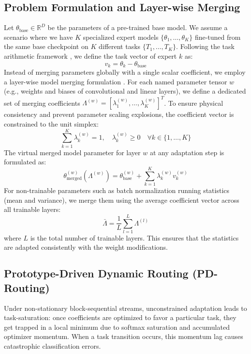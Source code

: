 \documentclass{article}
\theoremstyle{plain}
\theoremstyle{definition}
\theoremstyle{remark}
\begin{document}
\subsection{Problem Formulation and Layer-wise Merging}
Let $\theta_{\text{base}} \in \mathbb{R}^D$ be the parameters of a pre-trained base model. We assume a scenario where we have $K$ specialized expert models $\{\theta_1, \ldots, \theta_K\}$ fine-tuned from the same base checkpoint on $K$ different tasks $\{T_1, \ldots, T_K\}$. Following the task arithmetic framework \cite{ilharco2022editing}, we define the task vector of expert $k$ as:
\begin{equation}
  v_k = \theta_k - \theta_{\text{base}}
\end{equation}
Instead of merging parameters globally with a single scalar coefficient, we employ a layer-wise model merging formulation \cite{yang2024adamerging}. For each named parameter tensor $w$ (e.g., weights and biases of convolutional and linear layers), we define a dedicated set of merging coefficients $\Lambda^{(w)} = [\lambda_1^{(w)}, \ldots, \lambda_K^{(w)}]^T$. To ensure physical consistency and prevent parameter scaling explosions, the coefficient vector is constrained to the unit simplex:
\begin{equation}
  \sum_{k=1}^K \lambda_k^{(w)} = 1, \quad \lambda_k^{(w)} \geq 0 \quad \forall k \in \{1, \ldots, K\}
\end{equation}
The virtual merged model parameter for layer $w$ at any adaptation step is formulated as:
\begin{equation}
  \theta_{\text{merged}}^{(w)}(\Lambda^{(w)}) = \theta_{\text{base}}^{(w)} + \sum_{k=1}^K \lambda_k^{(w)} v_k^{(w)}
\end{equation}
For non-trainable parameters such as batch normalization running statistics (mean and variance), we merge them using the average coefficient vector across all trainable layers:
\begin{equation}
  \bar{\Lambda} = \frac{1}{L} \sum_{l=1}^L \Lambda^{(l)}
\end{equation}
where $L$ is the total number of trainable layers. This ensures that the statistics are adapted consistently with the weight modifications.

\subsection{Prototype-Driven Dynamic Routing (PD-Routing)}
Under non-stationary block-sequential streams, unconstrained adaptation leads to task-saturation: once coefficients are optimized to favor a particular task, they get trapped in a local minimum due to softmax saturation and accumulated optimizer momentum. When a task transition occurs, this momentum lag causes catastrophic classification errors.
\end{document}
